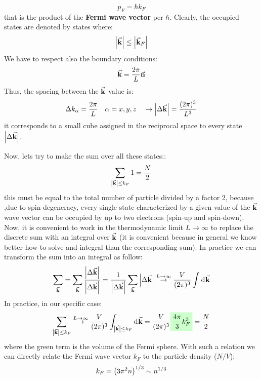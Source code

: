 \documentclass[../main/main.tex]{subfiles}
\begin{document}
\begin{equation*}
  p_F = \hbar k_F
\end{equation*}
that is the product of the \textbf{Fermi wave vector} per \( \hbar  \).
Clearly, the occupied states are denoted by states where:
\begin{equation*}
  \abs{\va{k}} \le \abs{\va{k}_F}
\end{equation*}
We have to respect also the boundary conditions:
\begin{equation*}
  \va{k} = \frac{2 \pi }{L}\va{n}
\end{equation*}
Thus, the spacing between the \( \va{k} \) value is:
\begin{equation*}
  \Delta k_ \alpha = \frac{2 \pi }{L} \quad \alpha =x,y,z \quad \rightarrow   \abs{\Delta \va{k}}  = \frac{(2 \pi )^3}{L^3}
\end{equation*}
it corresponds to a small cube assigned in the reciprocal space to every state \( \abs{\Delta \va{k}}  \).

Now, lets try to make the sum over all these states::
\begin{equation*}
  \sum_{\abs{\va{k}}\le k_F }^{} 1 = \frac{N}{2}
\end{equation*}
this must be equal to the total number of particle divided by a factor 2, because ,due to spin degeneracy, every single state characterized by a given value of the \( \va{k} \)  wave vector can be occupied by up to two electrons (spin-up and spin-down).
Now, it is convenient to work in the thermodynamic limit \( L \rightarrow \infty  \) to replace the discrete sum with an integral over \( \va{k} \) (it is convenient because in general we know better how to solve and integral than the corresponding sum). In practice we can transform the sum into an integral as follow:
\begin{equation}
  \sum_{\va{k }}^{} = \sum_{\va{k}}^{} \frac{\abs{\Delta \va{k}} }{\abs{\Delta \va{k}} } = \frac{1}{\abs{\Delta \va{k}} }  \sum_{\va{k}}^{}  \abs{\Delta \va{k}}
  \overset{L \rightarrow \infty }{\rightarrow  } \frac{V}{(2 \pi )^3} \int_{}^{} \dd[]{\va{k}}
  \label{eq:5_2}
\end{equation}
In practice, in our specific case:
\begin{equation*}
  \sum_{\abs{\va{k}} \le k_F }^{}   \overset{L \rightarrow \infty }{\rightarrow  }
  \frac{V}{(2 \pi )^3} \int_{\abs{\va{k}} \le k_F}^{} \dd[]{\va{k}}
  = \frac{V}{(2 \pi )^3} \mathcolorbox{green!20}{\frac{4 \pi }{3} k_F^3} = \frac{N}{2}
\end{equation*}
where the green term is the volume of the Fermi sphere.
With such a relation we can directly relate the Fermi wave vector \( k_F \) to the particle density (\( N/V\)):
\begin{equation*}
  k_F = \qty(3 \pi ^2 n)^{1/3} \sim n^{1/3}
\end{equation*}
\end{document}
